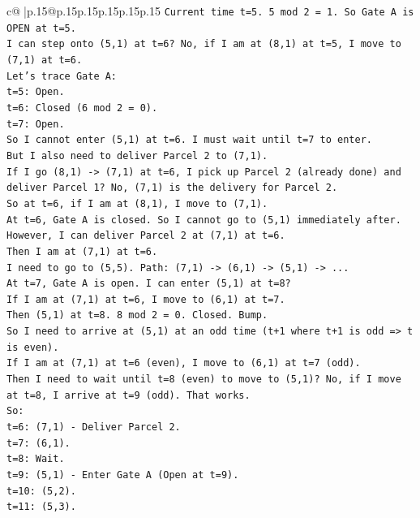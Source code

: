 \documentclass{article}
\begin{document}
{\begin{supertabular}{c@{$\;$}|p{.15\linewidth}@{}p{.15\linewidth}p{.15\linewidth}p{.15\linewidth}p{.15\linewidth}p{.15\linewidth}}
{{{\texttt{Current time t=5. 5 mod 2 = 1. So Gate A is OPEN at t=5.} \\
\texttt{I can step onto (5,1) at t=6? No, if I am at (8,1) at t=5, I move to (7,1) at t=6.} \\
\texttt{Let's trace Gate A:} \\
\texttt{t=5: Open.} \\
\texttt{t=6: Closed (6 mod 2 = 0).} \\
\texttt{t=7: Open.} \\
\texttt{So I cannot enter (5,1) at t=6. I must wait until t=7 to enter.} \\
\texttt{But I also need to deliver Parcel 2 to (7,1).} \\
\texttt{If I go (8,1) {-}> (7,1) at t=6, I pick up Parcel 2 (already done) and deliver Parcel 1? No, (7,1) is the delivery for Parcel 2.} \\
\texttt{So at t=6, if I am at (8,1), I move to (7,1).} \\
\texttt{At t=6, Gate A is closed. So I cannot go to (5,1) immediately after.} \\
\texttt{However, I can deliver Parcel 2 at (7,1) at t=6.} \\
\texttt{Then I am at (7,1) at t=6.} \\
\texttt{I need to go to (5,5). Path: (7,1) {-}> (6,1) {-}> (5,1) {-}> ...} \\
\texttt{At t=7, Gate A is open. I can enter (5,1) at t=8?} \\
\texttt{If I am at (7,1) at t=6, I move to (6,1) at t=7.} \\
\texttt{Then (5,1) at t=8. 8 mod 2 = 0. Closed. Bump.} \\
\texttt{So I need to arrive at (5,1) at an odd time (t+1 where t+1 is odd => t is even).} \\
\texttt{If I am at (7,1) at t=6 (even), I move to (6,1) at t=7 (odd).} \\
\texttt{Then I need to wait until t=8 (even) to move to (5,1)? No, if I move at t=8, I arrive at t=9 (odd). That works.} \\
\texttt{So:} \\
\texttt{t=6: (7,1) {-} Deliver Parcel 2.} \\
\texttt{t=7: (6,1).} \\
\texttt{t=8: Wait.} \\
\texttt{t=9: (5,1) {-} Enter Gate A (Open at t=9).} \\
\texttt{t=10: (5,2).} \\
\texttt{t=11: (5,3).} \\
}}}
\end{supertabular}}
\end{document}
